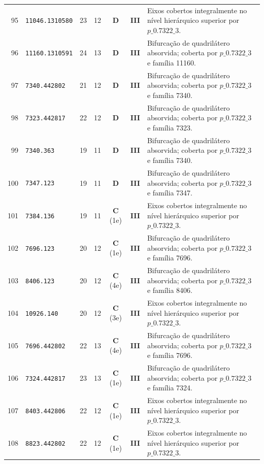\documentclass[11pt,a4paper]{article}
\begin{document}
\begin{small}
\begin{longtable}{r l c c c c p{8.8cm}}
95 & \texttt{11046.1310580} & 23 & 12 & \textbf{D} & \textbf{III} & Eixos cobertos integralmente no nível hierárquico superior por $p\_0.7322\_3$. \\
96 & \texttt{11160.1310591} & 24 & 13 & \textbf{D} & \textbf{III} & Bifurcação de quadrilátero absorvida; coberta por $p\_0.7322\_3$ e família 11160. \\
97 & \texttt{7340.442802} & 21 & 12 & \textbf{D} & \textbf{III} & Bifurcação de quadrilátero absorvida; coberta por $p\_0.7322\_3$ e família 7340. \\
98 & \texttt{7323.442817} & 22 & 12 & \textbf{D} & \textbf{III} & Bifurcação de quadrilátero absorvida; coberta por $p\_0.7322\_3$ e família 7323. \\
99 & \texttt{7340.363} & 19 & 11 & \textbf{D} & \textbf{III} & Bifurcação de quadrilátero absorvida; coberta por $p\_0.7322\_3$ e família 7340. \\
100 & \texttt{7347.123} & 19 & 11 & \textbf{D} & \textbf{III} & Bifurcação de quadrilátero absorvida; coberta por $p\_0.7322\_3$ e família 7347. \\
101 & \texttt{7384.136} & 19 & 11 & \textbf{C} (1e) & \textbf{III} & Eixos cobertos integralmente no nível hierárquico superior por $p\_0.7322\_3$. \\
102 & \texttt{7696.123} & 20 & 12 & \textbf{C} (1e) & \textbf{III} & Bifurcação de quadrilátero absorvida; coberta por $p\_0.7322\_3$ e família 7696. \\
103 & \texttt{8406.123} & 20 & 12 & \textbf{C} (4e) & \textbf{III} & Bifurcação de quadrilátero absorvida; coberta por $p\_0.7322\_3$ e família 8406. \\
104 & \texttt{10926.140} & 20 & 12 & \textbf{C} (3e) & \textbf{III} & Eixos cobertos integralmente no nível hierárquico superior por $p\_0.7322\_3$. \\
105 & \texttt{7696.442802} & 22 & 13 & \textbf{C} (4e) & \textbf{III} & Bifurcação de quadrilátero absorvida; coberta por $p\_0.7322\_3$ e família 7696. \\
106 & \texttt{7324.442817} & 23 & 13 & \textbf{C} (1e) & \textbf{III} & Bifurcação de quadrilátero absorvida; coberta por $p\_0.7322\_3$ e família 7324. \\
107 & \texttt{8403.442806} & 22 & 12 & \textbf{C} (1e) & \textbf{III} & Eixos cobertos integralmente no nível hierárquico superior por $p\_0.7322\_3$. \\
108 & \texttt{8823.442802} & 22 & 12 & \textbf{C} (1e) & \textbf{III} & Eixos cobertos integralmente no nível hierárquico superior por $p\_0.7322\_3$. \\

\end{longtable}
\end{small}
\end{document}

